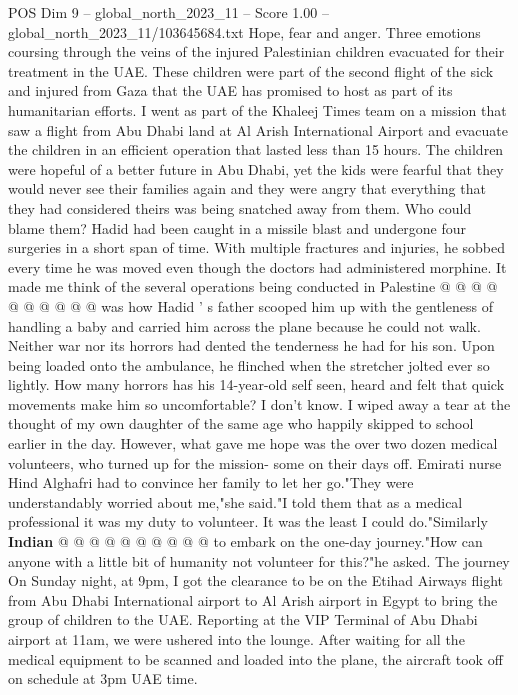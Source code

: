 \begin{textsample}{POS Dim 9 – global\_north\_2023\_11 – Score 1.00 – global\_north\_2023\_11/103645684.txt}  \label{ex:f9_pos_383}
Hope, fear and anger.
Three emotions coursing through the veins of the injured Palestinian children evacuated for their treatment in the UAE.
These children were part of the second flight of the sick and injured from Gaza that the UAE has promised to host as part of its humanitarian efforts.
I went as part of the Khaleej Times team on a mission that saw a flight from Abu Dhabi land at Al Arish International Airport and evacuate the children in an efficient operation that lasted less than 15 hours.
The children were hopeful of a better future in Abu Dhabi, yet the kids were fearful that they would never see their families again and they were angry that everything that they had considered theirs was being snatched away from them.
Who could blame them?
Hadid had been caught in a missile blast and undergone four surgeries in a short span of time.
With multiple fractures and injuries, he sobbed every time he was moved even though the doctors had administered morphine.
It made me think of the several operations being conducted in Palestine @ @ @ @ @ @ @ @ @ @ was how Hadid ' s father scooped him up with the gentleness of handling a baby and carried him across the plane because he could not walk.
Neither war nor its horrors had dented the tenderness he had for his son.
Upon being loaded onto the ambulance, he flinched when the stretcher jolted ever so lightly.
How many horrors has his 14-year-old self seen, heard and felt that quick movements make him so uncomfortable?
I don't know.
I wiped away a tear at the thought of my own daughter of the same age who happily skipped to school earlier in the day.
However, what gave me hope was the over two dozen medical volunteers, who turned up for the mission- some on their days off.
Emirati nurse Hind Alghafri had to convince her family to let her go."They were understandably worried about me,"she said."I told them that as a medical professional it was my duty to volunteer.
It was the least I could do."Similarly \textbf{Indian} @ @ @ @ @ @ @ @ @ @ to embark on the one-day journey."How can anyone with a little bit of humanity not volunteer for this?"he asked.
The journey On Sunday night, at 9pm, I got the clearance to be on the Etihad Airways flight from Abu Dhabi International airport to Al Arish airport in Egypt to bring the group of children to the UAE.
Reporting at the VIP Terminal of Abu Dhabi airport at 11am, we were ushered into the lounge.
After waiting for all the medical equipment to be scanned and loaded into the plane, the aircraft took off on schedule at 3pm UAE time.

\end{textsample}

